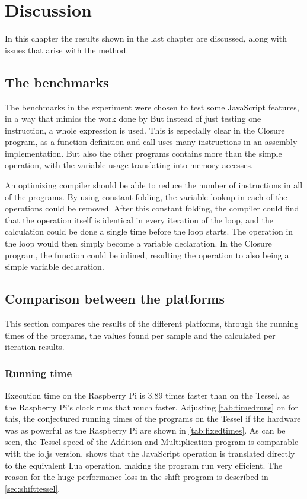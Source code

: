 \chapter{Discussion}
\label{chap:chapter5}
In this chapter the results shown in the last chapter are discussed, along with issues that arise with the method.

\section{The benchmarks}
\label{sec:benchmarkdiscussion}
The benchmarks in the experiment were chosen to test some JavaScript features, in a way that mimics the work done by \citeauthor{tiwari94} But instead of just testing one instruction, a whole expression is used. 
This is especially clear in the Closure program, as a function definition and call uses many instructions in an assembly implementation.
But also the other programs contains more than the simple operation, with the variable usage translating into memory accesses.

An optimizing compiler should be able to reduce the number of instructions in all of the programs.
By using constant folding, the variable lookup in each of the operations could be removed.
After this constant folding, the compiler could find that the operation itself is identical in every iteration of the loop, and the calculation could be done a single time before the loop starts.
The operation in the loop would then simply become a variable declaration.
In the Closure program, the function could be inlined, resulting the operation to also being a simple variable declaration.

\section{Comparison between the platforms}
This section compares the results of the different platforms, through the running times of the programs, the values found per sample and the calculated per iteration results.

\subsection{Running time}
Execution time on the Raspberry Pi is 3.89 times faster than on the Tessel, as the Raspberry Pi's clock runs that much faster.
Adjusting \cref{tab:timedruns} on  for this, the conjectured running times of the programs on the Tessel if the hardware was as powerful as the Raspberry Pi are shown in \cref{tab:fixedtimes}.
As can be seen, the Tessel speed of the Addition and Multiplication program is comparable with the io.js version.
 shows that the JavaScript operation is translated directly to the equivalent Lua operation, making the program run very efficient.
The reason for the huge performance loss in the shift program is described in \cref{sec:shifttessel}.

